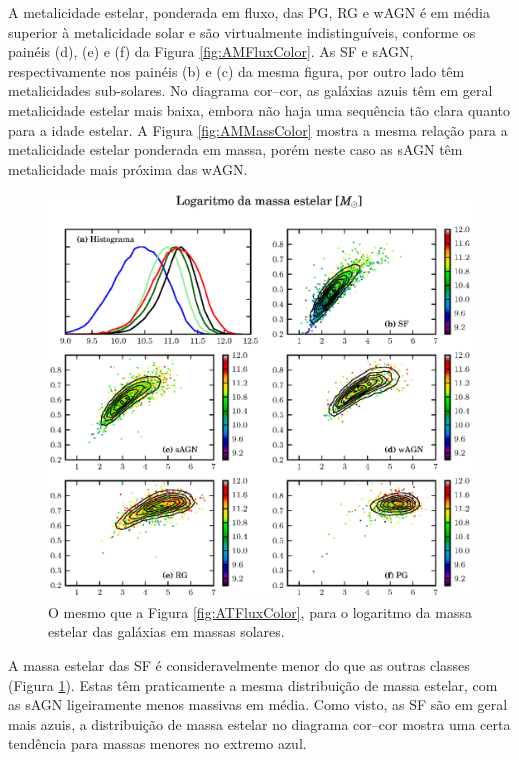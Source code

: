 A metalicidade estelar, ponderada em fluxo, das PG, RG e wAGN é em média
superior à metalicidade solar e são virtualmente indistinguíveis, conforme os
painéis (d), (e) e (f) da Figura \ref{fig:AMFluxColor}. As SF e sAGN,
respectivamente nos painéis (b) e (c) da mesma figura, por outro lado têm
metalicidades sub-solares. No diagrama cor--cor, as galáxias azuis têm em geral
metalicidade estelar mais baixa, embora não haja uma sequência tão clara quanto
para a idade estelar. A Figura \ref{fig:AMMassColor} mostra a mesma relação para
a metalicidade estelar ponderada em massa, porém neste caso as sAGN têm
metalicidade mais próxima das wAGN.

\begin{figure}
	\includegraphics{figuras/uvcolor-color-mcor_gal-byclass.eps}
	\caption[Massa estelar das galáxias no diagrama cor--cor.]
	{O mesmo que a Figura \ref{fig:ATFluxColor}, para o logaritmo da massa estelar
	das galáxias em massas solares.}
	\label{fig:MCorGalColor}
\end{figure}

A massa estelar das SF é consideravelmente menor do que as outras classes
(Figura \ref{fig:MCorGalColor}). Estas têm praticamente a mesma distribuição de
massa estelar, com as sAGN ligeiramente menos massivas em média. Como visto, as
SF são em geral mais azuis, a distribuição de massa estelar no diagrama cor--cor
mostra uma certa tendência para massas menores no extremo azul.

